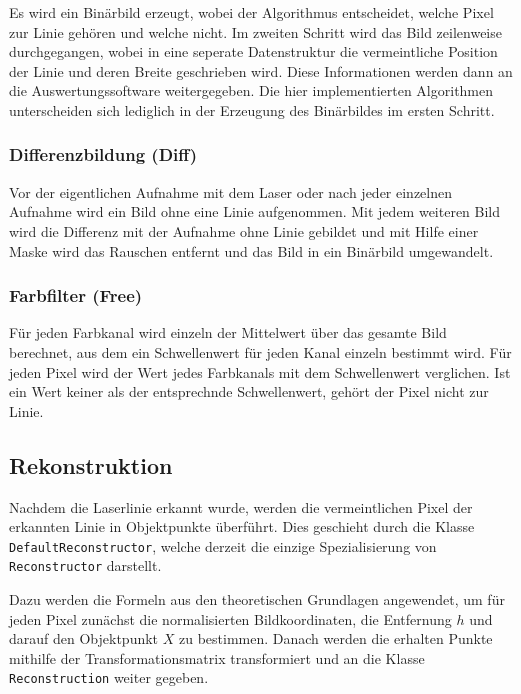 \documentclass[ngerman,a4paper,parskip=half]{scrartcl}
\begin{document}
Es wird ein Binärbild erzeugt, wobei der Algorithmus entscheidet, welche Pixel zur Linie gehören und welche nicht. Im zweiten Schritt wird das Bild zeilenweise durchgegangen, wobei in eine seperate Datenstruktur die vermeintliche Position der Linie und deren Breite geschrieben wird. Diese Informationen werden dann an die Auswertungssoftware weitergegeben. Die hier implementierten Algorithmen unterscheiden sich lediglich in der Erzeugung des Binärbildes im ersten Schritt.

\subsubsection{Differenzbildung (Diff)}

Vor der eigentlichen Aufnahme mit dem Laser oder nach jeder einzelnen Aufnahme wird ein Bild ohne eine Linie aufgenommen. Mit jedem weiteren Bild wird die Differenz mit der Aufnahme ohne Linie gebildet und mit Hilfe einer Maske wird das Rauschen entfernt und das Bild in ein Binärbild umgewandelt.

\subsubsection{Farbfilter (Free)}

Für jeden Farbkanal wird einzeln der Mittelwert über das gesamte Bild berechnet, aus dem ein Schwellenwert für jeden Kanal einzeln bestimmt wird. Für jeden Pixel wird der Wert jedes Farbkanals mit dem Schwellenwert verglichen. Ist ein Wert keiner als der entsprechnde Schwellenwert, gehört der Pixel nicht zur Linie.

\subsection{Rekonstruktion}

Nachdem die Laserlinie erkannt wurde, werden die vermeintlichen Pixel der erkannten Linie in Objektpunkte überführt. Dies geschieht durch die Klasse \texttt{DefaultReconstructor}, welche derzeit die einzige Spezialisierung von \texttt{Reconstructor} darstellt.

Dazu werden die Formeln aus den theoretischen Grundlagen angewendet, um für jeden Pixel zunächst die normalisierten Bildkoordinaten, die Entfernung $h$ und darauf den Objektpunkt $X$ zu bestimmen. Danach werden die erhalten Punkte mithilfe der Transformationsmatrix transformiert und an die Klasse \texttt{Reconstruction} weiter gegeben.
\end{document}
